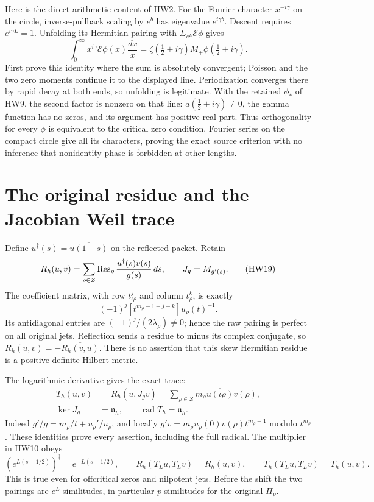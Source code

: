 Here is the direct arithmetic content of HW2. For the Fourier
character \(x^{-i\gamma}\) on the circle, inverse-pullback
scaling by \(e^b\) has eigenvalue \(e^{i\gamma b}\).
Descent requires \(e^{i\gamma L}=1\).
Unfolding its Hermitian pairing with
\(\Sigma_{e^L}\mathcal E\phi\) gives
\[
 \int_0^\infty x^{i\gamma}\mathcal E\phi(x)\frac{dx}{x}
   =\zeta(\tfrac12+i\gamma)
      M_+\phi(\tfrac12+i\gamma).
 \tag{HW18}
\]
First prove this identity where the sum is absolutely convergent;
Poisson and the two zero moments continue it to the displayed
line. Periodization converges there by rapid decay at both
ends, so unfolding is legitimate. With the retained
\(\phi_*\) of HW9, the second factor is nonzero on that line:
\(a(\tfrac12+i\gamma)\ne0\), the gamma function has no zeros,
and its argument has positive real part. Thus orthogonality
for every \(\phi\) is equivalent to the critical zero condition.
Fourier series on the compact circle give all its characters,
proving the exact source criterion with no inference that
nonidentity phase is forbidden at other lengths.

\section{The original residue and the Jacobian Weil trace}

Define \(u^\dagger(s)=\overline{u(1-\bar s)}\) on the
reflected packet. Retain
\[
 R_h(u,v)=\sum_{\rho\in Z}\operatorname{Res}_\rho
          \frac{u^\dagger(s)v(s)}{g(s)}\,ds,\qquad
 J_g=M_{g'(s)}.
 \tag{HW19}
\]
The coefficient matrix, with row \(t_{\iota\rho}^j\) and
column \(t_\rho^k\), is exactly
\[
 (-1)^j[t^{m_\rho-1-j-k}]u_\rho(t)^{-1}.
 \tag{HW20}
\]
Its antidiagonal entries are
\((-1)^j/(2\lambda_\rho)\ne0\); hence the raw pairing is
perfect on all original jets. Reflection sends a residue to
minus its complex conjugate, so
\(R_h(u,v)=-\overline{R_h(v,u)}\).
There is no assertion that this skew Hermitian residue is a
positive definite Hilbert metric.

The logarithmic derivative gives the exact trace:
\[
 \begin{split}
 T_h(u,v)&=R_h(u,J_gv)
       =\sum_{\rho\in Z}m_\rho
                      \overline{u(\iota\rho)}v(\rho),\\
 \ker J_g&=\mathfrak n_h,\qquad
 \operatorname{rad}T_h=\mathfrak n_h .
 \end{split}
 \tag{HW21}\label{hw:weilpacket}
\]
Indeed \(g'/g=m_\rho/t+u_\rho'/u_\rho\), and locally
\(g'v=m_\rho u_\rho(0)v(\rho)t^{m_\rho-1}\) modulo
\(t^{m_\rho}\). These identities prove every assertion,
including the full radical.
The multiplier in HW10 obeys
\[
 (e^{L(s-1/2)})^\dagger=e^{-L(s-1/2)},\qquad
 R_h(T_Lu,T_Lv)=R_h(u,v),\qquad
 T_h(T_Lu,T_Lv)=T_h(u,v).
 \tag{HW22}\label{hw:isometry}
\]
This is true even for offcritical zeros and nilpotent jets.
Before the shift the two pairings are \(e^L\)-similitudes,
in particular \(p\)-similitudes for the original \(\Pi_p\).

